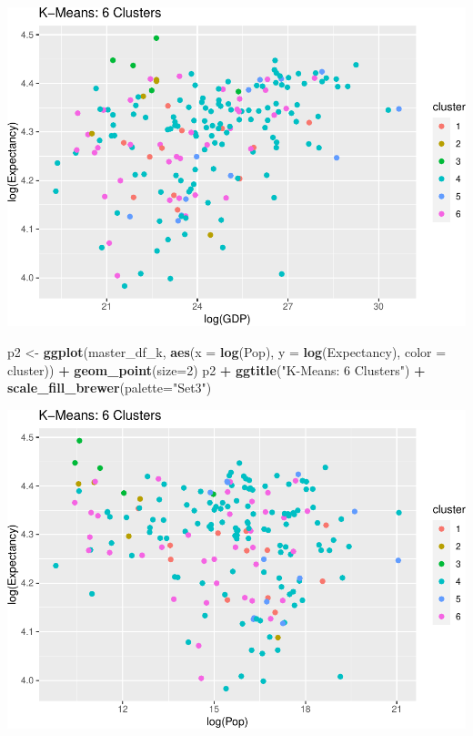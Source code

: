 \documentclass[]{article}
\newenvironment{Shaded}{\begin{snugshade}}{\end{snugshade}}
\newcommand{\DataTypeTok}[1]{\textcolor[rgb]{0.13,0.29,0.53}{#1}}
\newcommand{\DecValTok}[1]{\textcolor[rgb]{0.00,0.00,0.81}{#1}}
\newcommand{\KeywordTok}[1]{\textcolor[rgb]{0.13,0.29,0.53}{\textbf{#1}}}
\newcommand{\NormalTok}[1]{#1}
\newcommand{\OperatorTok}[1]{\textcolor[rgb]{0.81,0.36,0.00}{\textbf{#1}}}
\newcommand{\StringTok}[1]{\textcolor[rgb]{0.31,0.60,0.02}{#1}}
\begin{document}
\includegraphics{eda_files/figure-latex/unnamed-chunk-26-4.pdf}

\begin{Shaded}
\begin{Highlighting}[]
\NormalTok{p2 <-}\StringTok{ }\KeywordTok{ggplot}\NormalTok{(master_df_k, }\KeywordTok{aes}\NormalTok{(}\DataTypeTok{x =} \KeywordTok{log}\NormalTok{(Pop), }\DataTypeTok{y =} \KeywordTok{log}\NormalTok{(Expectancy), }\DataTypeTok{color =}\NormalTok{ cluster)) }\OperatorTok{+}
\StringTok{  }\KeywordTok{geom_point}\NormalTok{(}\DataTypeTok{size=}\DecValTok{2}\NormalTok{)}
\NormalTok{p2 }\OperatorTok{+}\StringTok{ }\KeywordTok{ggtitle}\NormalTok{(}\StringTok{"K-Means: 6 Clusters"}\NormalTok{) }\OperatorTok{+}\StringTok{ }\KeywordTok{scale_fill_brewer}\NormalTok{(}\DataTypeTok{palette=}\StringTok{"Set3"}\NormalTok{)}
\end{Highlighting}
\end{Shaded}

\includegraphics{eda_files/figure-latex/unnamed-chunk-26-5.pdf}
\end{document}
